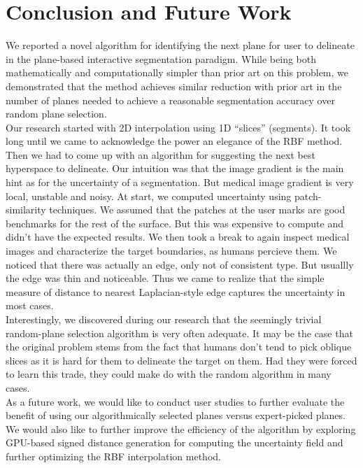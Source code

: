 \section{Conclusion and Future Work}
\label{sec:conclusion}


We reported a novel algorithm for identifying the next plane for user to delineate in the plane-based interactive segmentation paradigm. While being both mathematically and computationally simpler than prior art on this problem, we demonstrated that the method achieves similar reduction with prior art in the number of planes needed to achieve a reasonable segmentation accuracy over random plane selection.
\\
Our research started with 2D interpolation using 1D ``slices'' (segments). It took long until we came to acknowledge the power an elegance of the RBF method. 
Then we had to come up with an algorithm for suggesting the next best hyperspace to delineate.
Our intuition was that the image gradient is the main hint as for the uncertainty of a segmentation.
But medical image gradient is very local, unstable and noisy.
At start, we computed uncertainty using patch-similarity techniques. We assumed that the patches at the user marks are good benchmarks for the rest of the surface. But this was expensive to compute and didn't have the expected results.
We then took a break to again inspect medical images and characterize the target boundaries, as humans percieve them.
We noticed that there was actually an edge, only not of consistent type. But usuallly the edge was thin and noticeable.
Thus we came to realize that the simple measure of distance to nearest Laplacian-style edge captures the uncertainty in most cases.
\\
Interestingly, we discovered during our research that the seemingly trivial random-plane selection algorithm is very often adequate. It may be the case that the original problem stems from the fact that humans don't tend to pick oblique slices as it is hard for them to delineate the target on them. Had they were forced to learn this trade, they could make do with the random algorithm in many cases.
\\
As a future work, we would like to conduct user studies to further evaluate the benefit of using our algorithmically selected planes versus expert-picked planes. We would also like to further improve the efficiency of the algorithm by exploring GPU-based signed distance generation for computing the uncertainty field and further optimizing the RBF interpolation method.

